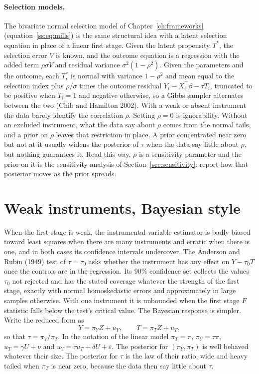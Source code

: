 \paragraph{Selection models.} The bivariate normal selection model of Chapter~\ref{ch:frameworks} (equation~\eqref{ss:eq:mills}) is the same structural idea with a latent selection equation in place of a linear first stage. Given the latent propensity $T^\ast$, the selection error $V$ is known, and the outcome equation is a regression with the added term $\rho\sigma V$ and residual variance $\sigma^2(1-\rho^2)$. Given the parameters and the outcome, each $T^\ast_i$ is normal with variance $1-\rho^2$ and mean equal to the selection index plus $\rho/\sigma$ times the outcome residual $Y_i - X_i^\top\beta - \tau T_i$, truncated to be positive when $T_i = 1$ and negative otherwise, so a Gibbs sampler alternates between the two (Chib and Hamilton 2002). With a weak or absent instrument the data barely identify the correlation $\rho$. Setting $\rho = 0$ is ignorability. Without an excluded instrument, what the data say about $\rho$ comes from the normal tails, and a prior on $\rho$ leaves that restriction in place. A prior concentrated near zero but not at it usually widens the posterior of $\tau$ when the data say little about $\rho$, but nothing guarantees it. Read this way, $\rho$ is a sensitivity parameter and the prior on it is the sensitivity analysis of Section~\ref{sec:sensitivity}: report how that posterior moves as the prior spreads.

\section{Weak instruments, Bayesian style}\label{iv:sec:weak}

When the first stage is weak, the instrumental variable estimator is badly biased toward least squares when there are many instruments and erratic when there is one, and in both cases its confidence intervals undercover. The Anderson and Rubin (1949) test of $\tau = \tau_0$ asks whether the instrument has any effect on $Y - \tau_0 T$ once the controls are in the regression. Its 90\% confidence set collects the values $\tau_0$ not rejected and has the stated coverage whatever the strength of the first stage, exactly with normal homoskedastic errors and approximately in large samples otherwise. With one instrument it is unbounded when the first stage $F$ statistic falls below the test's critical value. The Bayesian response is simpler. Write the reduced form as
\[
Y = \pi_Y Z + u_Y, \qquad T = \pi_T Z + u_T,
\]
so that $\tau = \pi_Y/\pi_T$. In the notation of the linear model $\pi_T = \pi$, $\pi_Y = \tau\pi$, $u_T = \gamma U + \nu$ and $u_Y = \tau u_T + \delta U + \varepsilon$. The posterior for $(\pi_Y, \pi_T)$ is well behaved whatever their size. The posterior for $\tau$ is the law of their ratio, wide and heavy tailed when $\pi_T$ is near zero, because the data then say little about $\tau$.

